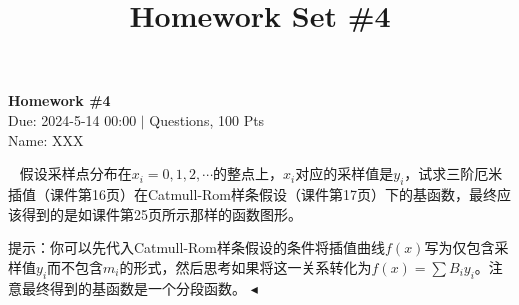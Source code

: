 \documentclass[11pt]{article}
\title{Homework Set \#4}
\newenvironment{question}[2][Question]{\begin{trivlist}
\item[\hskip \labelsep {\bfseries #1}\hskip \labelsep {\bfseries #2.}]}{\hfill$\blacktriangleleft$\end{trivlist}}
\begin{document}
    \pagestyle{fancy}
    \lhead{}
    \chead{}

    \begin{center}
        {\LARGE \bf Homework \#4}\\
        {Due: 2024-5-14 00:00 \quad$|$ Questions, 100 Pts}\\
        {Name: XXX}
    \end{center}

    \begin{question}{1 (100') (插值)}~
    假设采样点分布在$x_i=0, 1, 2, \cdots$的整点上，$x_i$对应的采样值是$y_i$，试求三阶厄米插值（课件第16页）在Catmull-Rom样条假设（课件第17页）下的基函数，最终应该得到的是如课件第25页所示那样的函数图形。
    
    提示：你可以先代入Catmull-Rom样条假设的条件将插值曲线$f(x)$写为仅包含采样值$y_i$而不包含$m_i$的形式，然后思考如果将这一关系转化为$f(x)=\sum B_i y_i$。注意最终得到的基函数是一个分段函数。
    \end{question}
\end{document}
